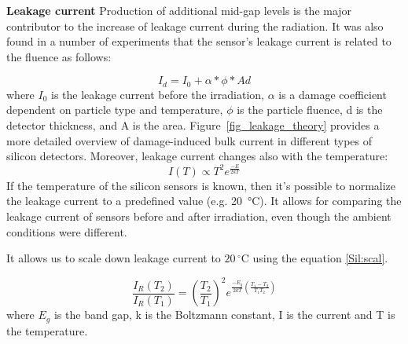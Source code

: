 \textbf{Leakage current}\bigbreak
Production of additional mid-gap levels is the major contributor to the increase of leakage current during the radiation. It was also found in a number of experiments that the sensor's leakage current is related to the fluence as follows:

\begin{equation}
\label{eq:fluence}
    I_{d} = I_{0} + \alpha * \phi * Ad
\end{equation}
where $I_{0}$ is the leakage current before the irradiation, $\alpha$ is a damage coefficient dependent on particle type and temperature, $\phi$ is the particle fluence, d is the detector thickness, and A is the area. Figure~\ref{fig_leakage_theory} provides a more detailed overview of damage-induced bulk current in different types of silicon detectors. Moreover, leakage current changes also with the temperature:
\begin{equation}
\label{Sil:temp}
    I(T) \propto T^{2}e^{\frac{-E}{2kT}}
\end{equation}
If the temperature of the silicon sensors is known, then it's possible to normalize the leakage current to a predefined value (e.g. \SI{20}{\celsius}). It allows for comparing the leakage current of sensors before and after irradiation, even though the ambient conditions were different. 

It allows us to scale down leakage current to $20\,^{\circ}$C using the equation \ref{Sil:scal}.
 
\begin{equation}
\label{Sil:scal}
    \frac{I_{R}(T_{2})}{I_{R}(T_{1})} = (\frac{T_{2}}{T_{1}})^{2}e^{\frac{-E_{g}}{2kT}(\frac{T_{1}-T_{2}}{T_{1}T_{2}})}
\end{equation}
where $E_{g}$ is the band gap, k is the Boltzmann constant, I is the current and T is the temperature.

